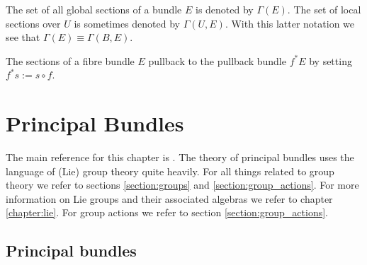     \begin{notation}
        The set of all global sections of a bundle $E$ is denoted by $\Gamma(E)$. The set of local sections over $U$ is sometimes denoted by $\Gamma(U, E)$. With this latter notation we see that $\Gamma(E)\equiv\Gamma(B, E)$.
    \end{notation}

    \begin{property}
        The sections of a fibre bundle $E$ pullback to the pullback bundle $f^*E$ by setting $f^*s := s\circ f$.
    \end{property}



\chapter{Principal Bundles}\label{chapter:principal_bundles}

    The main reference for this chapter is \cite{principal_bundles}. The theory of principal bundles uses the language of (Lie) group theory quite heavily. For all things related to group theory we refer to sections \ref{section:groups} and \ref{section:group_actions}. For more information on Lie groups and their associated algebras we refer to chapter \ref{chapter:lie}. For group actions we refer to section \ref{section:group_actions}.

\section{Principal bundles}

